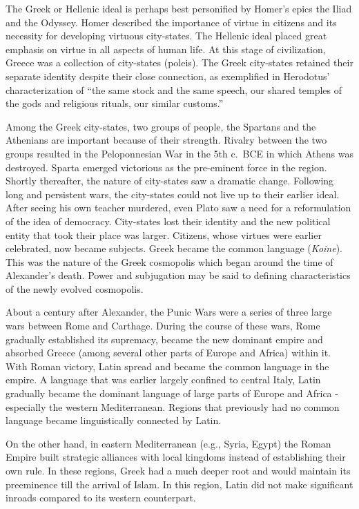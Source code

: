 The Greek or Hellenic ideal is perhaps best personified by Homer’s epics the Iliad and the Odyssey. Homer described the importance of virtue in citizens and its necessity for developing virtuous city-states. The Hellenic ideal placed great emphasis on virtue in all aspects of human life. At this stage of civilization, Greece was a collection of city-states (poleis). The Greek city-states retained their separate identity despite their close connection, as exemplified in Herodotus’ characterization of “the same stock and the same speech, our shared temples of the gods and religious rituals, our similar customs.”

Among the Greek city-states, two groups of people, the Spartans and the Athenians are important because of their strength. Rivalry between the two groups resulted in the Peloponnesian War in the 5th c.\ BCE in which Athens was destroyed. Sparta emerged victorious as the pre-eminent force in the region. Shortly thereafter, the nature of city-states saw a dramatic change. Following long and persistent wars, the city-states could not live up to their earlier ideal. After seeing his own teacher murdered, even Plato saw a need for a reformulation of the idea of democracy. City-states lost their identity and the new political entity that took their place was larger. Citizens, whose virtues were earlier celebrated, now became subjects. Greek became the common language ({\sl Koine}). This was the nature of the Greek cosmopolis which began around the time of Alexander’s death. Power and subjugation may be said to defining characteristics of the newly evolved cosmopolis.

About a century after Alexander, the Punic Wars were a series of three large wars between Rome and Carthage. During the course of these wars, Rome gradually established its supremacy, became the new dominant empire and absorbed Greece (among several other parts of Europe and Africa) within it. With Roman victory, Latin spread and became the common language in the empire. A language that was earlier largely confined to central Italy, Latin gradually became the dominant language of large parts of Europe and Africa - especially the western Mediterranean. Regions that previously had no common language became linguistically connected by Latin.

On the other hand, in eastern Mediterranean (e.g., Syria, Egypt) the Roman Empire built strategic alliances with local kingdoms instead of establishing their own rule. In these regions, Greek had a much deeper root and would maintain its preeminence till the arrival of Islam. In this region, Latin did not make significant inroads compared to its western counterpart.

